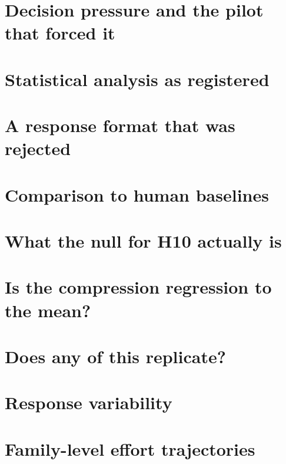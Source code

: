 \section{Decision pressure and the pilot that forced it}


\section{Statistical analysis as registered}


\section{A response format that was rejected}


\section{Comparison to human baselines}


\section{What the null for H10 actually is}


\section{Is the compression regression to the mean?}


\section{Does any of this replicate?}


\section{Response variability}


\section{Family-level effort trajectories}
\label{app:trajectories}


